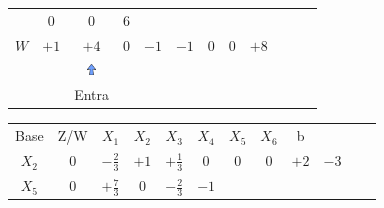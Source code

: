\documentclass{beamer}
\begin{document}
\begin{frame}
{\begin{table}
\begin{tabular}{c c c c c c c c c c c c}
				& \cellcolor{yellow!50} $\scriptstyle 0$
				& \cellcolor{yellow!50} $\scriptstyle 0$ 
				& \cellcolor{yellow!50} $\scriptstyle 6$  \\
				\cellcolor{blue!100} \color{white} $\scriptstyle W$
				& \cellcolor{yellow!90} $\scriptstyle +1$
				& \cellcolor{gray!50} $\scriptstyle +4$
				& \cellcolor{yellow!90} $\scriptstyle 0$
				& \cellcolor{yellow!90} $\scriptstyle -1$
				& \cellcolor{yellow!90} $\scriptstyle -1$
				& \cellcolor{yellow!90} $\scriptstyle 0$
				& \cellcolor{yellow!90} $\scriptstyle 0$ 
				& \cellcolor{yellow!90} $\scriptstyle +8$  \\
				& & \includegraphics[width=0.3cm,height=0.3cm]{setacima.jpg} \\
				& & \scriptsize Entra \\
			\end{tabular}
		\end{table}			
	}
	{
		\begin{table}		
			\begin{tabular}{c c c c c c c c c c c c}
				\cline{1-8} 
				\cellcolor{blue!100} \color{white} \scriptsize Base 
				&\cellcolor{blue!100} \color{white} \scriptsize Z/W
				&\cellcolor{blue!100} \color{white} $\scriptstyle X_1$ 
				&\cellcolor{blue!100} \color{red} $\scriptstyle X_2$ 
				&\cellcolor{blue!100} \color{white}   $\scriptstyle X_3$ 
				&\cellcolor{blue!100} \color{white} $\scriptstyle X_4$ 
				&\cellcolor{blue!100} \color{red}   $\scriptstyle X_5$ 
				&\cellcolor{blue!100} \color{red}   $\scriptstyle X_6$ 
				&\cellcolor{blue!100} \color{white} \scriptsize b
				&
				&
				& \\
				\cellcolor{blue!100} \color{red} $\scriptstyle X_2$
				& \cellcolor{yellow!50} $\scriptstyle 0$
				& \cellcolor{gray!50} $\scriptstyle -\frac{2}{3}$
				& \cellcolor{yellow!50} $\scriptstyle +1$
				& \cellcolor{yellow!50} $\scriptstyle +\frac{1}{3}$
				& \cellcolor{yellow!50} $\scriptstyle 0$
				& \cellcolor{yellow!50} $\scriptstyle 0$
				& \cellcolor{yellow!50} $\scriptstyle 0$
				& \cellcolor{gray!50} $\scriptstyle +2$ 
				& $ \scriptstyle -3 $ \\
			    \cellcolor{blue!100} \color{red} $\scriptstyle X_5$
				& \cellcolor{yellow!50} $\scriptstyle 0$
				& \cellcolor{gray!50} $\scriptstyle +\frac{7}{3}$
				& \cellcolor{yellow!50} $\scriptstyle 0$
				& \cellcolor{yellow!50} $\scriptstyle -\frac{2}{3}$			
				& \cellcolor{yellow!50} $\scriptstyle -1$

\end{tabular}
\end{table}}
\end{frame}
\end{document}
